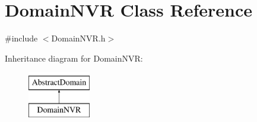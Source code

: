\hypertarget{class_domain_n_v_r}{}\section{Domain\+N\+VR Class Reference}
\label{class_domain_n_v_r}


{\ttfamily \#include $<$Domain\+N\+V\+R.\+h$>$}

Inheritance diagram for Domain\+N\+VR\+:\begin{figure}[H]
\begin{center}
\leavevmode
\includegraphics[height=2.000000cm]{class_domain_n_v_r}
\end{center}
\end{figure}
